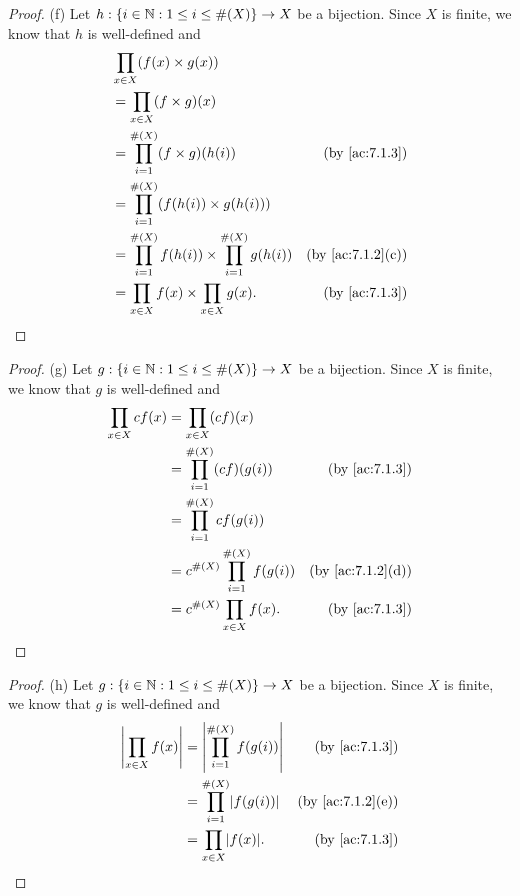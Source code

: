 \begin{proof}{(f)}
  Let \(h : \{i \in \mathbb{N} : 1 \leq i \leq \#(X)\} \to X\) be a bijection.
  Since \(X\) is finite, we know that \(h\) is well-defined and
  \begin{align*}
     & \prod_{x \in X} (f(x) \times g(x))                                                                    \\
     & = \prod_{x \in X} (f \times g)(x)                                                                     \\
     & = \prod_{i = 1}^{\#(X)} (f \times g)(h(i))                           & \text{(by \cref{ac:7.1.3})}    \\
     & = \prod_{i = 1}^{\#(X)} (f(h(i)) \times g(h(i)))                                                      \\
     & = \prod_{i = 1}^{\#(X)} f(h(i)) \times \prod_{i = 1}^{\#(X)} g(h(i)) & \text{(by \cref{ac:7.1.2}(c))} \\
     & = \prod_{x \in X} f(x) \times \prod_{x \in X} g(x).                  & \text{(by \cref{ac:7.1.3})}
  \end{align*}
\end{proof}

\begin{proof}{(g)}
  Let \(g : \{i \in \mathbb{N} : 1 \leq i \leq \#(X)\} \to X\) be a bijection.
  Since \(X\) is finite, we know that \(g\) is well-defined and
  \begin{align*}
    \prod_{x \in X} cf(x) & = \prod_{x \in X} (cf)(x)                                                  \\
                          & = \prod_{i = 1}^{\#(X)} (cf)(g(i))        & \text{(by \cref{ac:7.1.3})}    \\
                          & = \prod_{i = 1}^{\#(X)} cf(g(i))                                           \\
                          & = c^{\#(X)} \prod_{i = 1}^{\#(X)} f(g(i)) & \text{(by \cref{ac:7.1.2}(d))} \\
                          & = c^{\#(X)} \prod_{x \in X} f(x).         & \text{(by \cref{ac:7.1.3})}
  \end{align*}
\end{proof}

\begin{proof}{(h)}
  Let \(g : \{i \in \mathbb{N} : 1 \leq i \leq \#(X)\} \to X\) be a bijection.
  Since \(X\) is finite, we know that \(g\) is well-defined and
  \begin{align*}
    \abs{\prod_{x \in X} f(x)} & = \abs{\prod_{i = 1}^{\#(X)} f(g(i))} & \text{(by \cref{ac:7.1.3})}    \\
                               & = \prod_{i = 1}^{\#(X)} \abs{f(g(i))} & \text{(by \cref{ac:7.1.2}(e))} \\
                               & = \prod_{x \in X} \abs{f(x)}.         & \text{(by \cref{ac:7.1.3})}
  \end{align*}
\end{proof}

